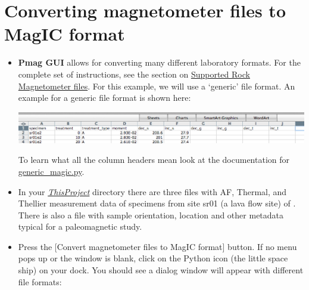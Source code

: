 \documentclass[11pt]{book}
\begin{document}
{ 

\section{Converting magnetometer files to MagIC format}
\begin{itemize}
\item {\bf Pmag GUI} allows for converting many different laboratory formats.  For the complete set of instructions, see the section on \href{#magnetometer_files}{Supported Rock Magnetometer files}.   For this example, we will use a `generic' file format.
An example for a generic file format is shown here:

\includegraphics[width=15cm]{EPSfiles/FigGenericFormat.eps}

To learn what all the column headers mean look at the documentation for \href{#generic_magic.py}{generic\_magic.py}.

%


\item In your  \href{#Project_Directory}{\it ThisProject} directory  there are three files with AF, Thermal, and Thellier measurement data of specimens from site sr01 (a lava flow site) of \cite{tauxe04b}.  There is also a file with sample orientation, location and other metadata typical for a paleomagnetic study.
\item Press the [Convert magnetometer files to MagIC format] button. If no menu pops up or the window is blank, click on the Python icon  (the little space ship) on your dock. You should see a dialog window will appear with different file formats:


\end{itemize}}
\end{document}

